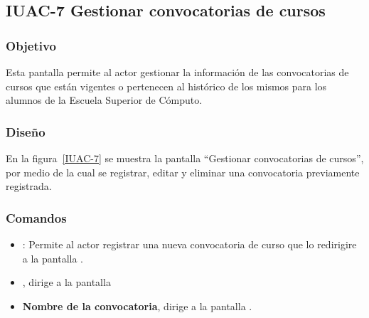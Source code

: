 \subsection{IUAC-7  Gestionar convocatorias de cursos}
 
\subsubsection{Objetivo}

    Esta pantalla permite al actor  gestionar la información de las convocatorias de cursos que están vigentes o pertenecen al histórico de los mismos para los alumnos de la Escuela Superior de Cómputo.

\subsubsection{Diseño}

    En la figura~\ref{IUAC-7} se muestra la pantalla ``Gestionar convocatorias de cursos'', por medio de la cual se registrar, editar y eliminar una convocatoria previamente registrada. \\


\subsubsection{Comandos}
\begin{itemize}
    \item {}: Permite al actor registrar una nueva convocatoria de curso que lo redirigire a la pantalla .
    \item {}, dirige a la pantalla 
    \item \textbf{Nombre de la convocatoria}, dirige a la pantalla .
\end{itemize}

